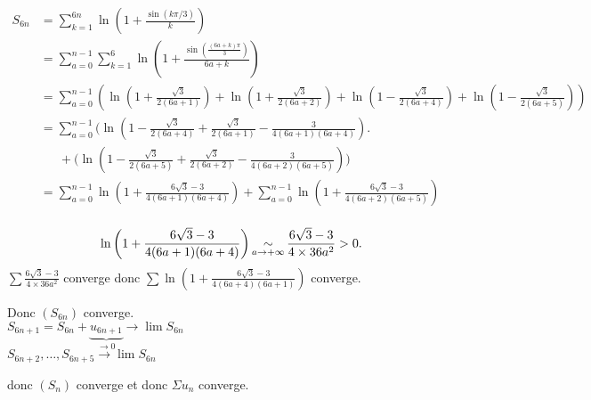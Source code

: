 \begin{enumerate}
		\begin{align*}
			S_{6n} &= \sum_{k=1}^{6n} \ln\left( 1+ \frac{\sin(k\pi / 3)}{k} \right) \\
			&= \sum_{a=0}^{n-1}\sum_{k=1}^6 \ln\left( 1 + \frac{\sin\left( \frac{(6a + k) \pi}{3} \right)}{6a + k} \right) \\
			&= \sum_{a=0}^{n-1} \left(
				\ln\left( 1+ \frac{\sqrt{3}}{2(6a + 1)} \right)
				+\ln\left( 1+ \frac{\sqrt{3}}{2(6a + 2)} \right)
				+\ln\left( 1- \frac{\sqrt{3}}{2(6a + 4)} \right)
				+\ln\left( 1- \frac{\sqrt{3}}{2(6a + 5)} \right)
			\right) \\
			&= \sum_{a=0}^{n-1} \Bigg(\ln\left( 1- \frac{\sqrt{3}}{2(6a+4)} + \frac{\sqrt{3}}{2(6a+1)} - \frac{3}{4(6a+1)(6a+4)} \right)\Bigg.\\
			&\phantom{=}\,+ \Bigg(\ln\left( 1-\frac{\sqrt{3}}{2(6a + 5)} + \frac{\sqrt{3}}{2(6a + 2)} - \frac{3}{4(6a+2)(6a+5)} \right) \Bigg) \\
			&= \sum_{a=0}^{n-1} \ln\left( 1 + \frac{6\sqrt{3} - 3}{4(6a + 1)(6a+4)} \right) 
			+ \sum_{a=0}^{n-1} \ln\left( 1 + \frac{6\sqrt{3} - 3}{4(6a+2)(6a+5)} \right)\\
		\end{align*}
\end{enumerate}

 \[
	\ln\left( 1 + \frac{6\sqrt{3} - 3}{4(6a + 1)(6a + 4)} \right) \operatorname*{\sim}_{a\to +\infty} \frac{6\sqrt{3} - 3}{4 \times  36a^2} > 0.
\]
$\sum \frac{6\sqrt{3} - 3}{4 \times 36a^2}$ converge donc $\sum \ln \left( 1 + \frac{6 \sqrt{3} - 3}{4(6a + 4)(6a+1)} \right)$ converge.

Donc $(S_{6n})$ converge.\\
$S_{6n+1} = S_{6n} + \underbrace{u_{6n+1}}_{\to 0} \longrightarrow \lim S_{6n}$ \\
$S_{6n+2},\ldots,S_{6n+5} \longrightarrow \lim S_{6n}$

donc $(S_n)$ converge et donc $\Sigma u_n$ converge.


